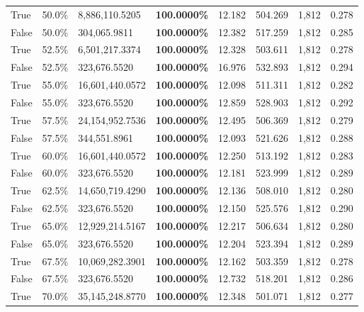 \begin{table}[H]
\begin{tabular}{lllrllll}
\cline{1-8}
True & 50.0\% & 8,886,110.5205 & \bfseries \color{red} 100.0000\% & 12.182 & 504.269 & 1,812 & 0.278 \\
\cline{1-8}
False & 50.0\% & \color{red} 304,065.9811 & \bfseries \color{red} 100.0000\% & 12.382 & 517.259 & 1,812 & 0.285 \\
\cline{1-8}
True & 52.5\% & 6,501,217.3374 & \bfseries \color{red} 100.0000\% & 12.328 & 503.611 & 1,812 & 0.278 \\
\cline{1-8}
False & 52.5\% & 323,676.5520 & \bfseries \color{red} 100.0000\% & 16.976 & 532.893 & 1,812 & 0.294 \\
\cline{1-8}
True & 55.0\% & 16,601,440.0572 & \bfseries \color{red} 100.0000\% & 12.098 & 511.311 & 1,812 & 0.282 \\
\cline{1-8}
False & 55.0\% & 323,676.5520 & \bfseries \color{red} 100.0000\% & 12.859 & 528.903 & 1,812 & 0.292 \\
\cline{1-8}
True & 57.5\% & 24,154,952.7536 & \bfseries \color{red} 100.0000\% & 12.495 & 506.369 & 1,812 & 0.279 \\
\cline{1-8}
False & 57.5\% & 344,551.8961 & \bfseries \color{red} 100.0000\% & 12.093 & 521.626 & 1,812 & 0.288 \\
\cline{1-8}
True & 60.0\% & 16,601,440.0572 & \bfseries \color{red} 100.0000\% & 12.250 & 513.192 & 1,812 & 0.283 \\
\cline{1-8}
False & 60.0\% & 323,676.5520 & \bfseries \color{red} 100.0000\% & 12.181 & 523.999 & 1,812 & 0.289 \\
\cline{1-8}
True & 62.5\% & 14,650,719.4290 & \bfseries \color{red} 100.0000\% & 12.136 & 508.010 & 1,812 & 0.280 \\
\cline{1-8}
False & 62.5\% & 323,676.5520 & \bfseries \color{red} 100.0000\% & 12.150 & 525.576 & 1,812 & 0.290 \\
\cline{1-8}
True & 65.0\% & 12,929,214.5167 & \bfseries \color{red} 100.0000\% & 12.217 & 506.634 & 1,812 & 0.280 \\
\cline{1-8}
False & 65.0\% & 323,676.5520 & \bfseries \color{red} 100.0000\% & 12.204 & 523.394 & 1,812 & 0.289 \\
\cline{1-8}
True & 67.5\% & 10,069,282.3901 & \bfseries \color{red} 100.0000\% & 12.162 & 503.359 & 1,812 & 0.278 \\
\cline{1-8}
False & 67.5\% & 323,676.5520 & \bfseries \color{red} 100.0000\% & 12.732 & 518.201 & 1,812 & 0.286 \\
\cline{1-8}
True & 70.0\% & 35,145,248.8770 & \bfseries \color{red} 100.0000\% & 12.348 & 501.071 & 1,812 & 0.277 \\

\end{tabular}
\end{table}
